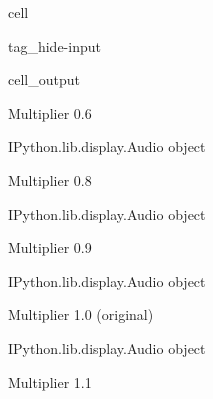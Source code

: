 \documentclass[letterpaper,10pt,english]{jupyterBook}
\begin{document}
\begin{sphinxuseclass}{cell}
\begin{sphinxuseclass}{tag_hide-input}\begin{sphinxVerbatimOutput}

\begin{sphinxuseclass}{cell_output}
\begin{sphinxVerbatim}[commandchars=\\\{\}]
Multiplier 0.6
\end{sphinxVerbatim}

\begin{sphinxVerbatim}[commandchars=\\\{\}]
\PYGZlt{}IPython.lib.display.Audio object\PYGZgt{}
\end{sphinxVerbatim}

\begin{sphinxVerbatim}[commandchars=\\\{\}]
Multiplier 0.8
\end{sphinxVerbatim}

\begin{sphinxVerbatim}[commandchars=\\\{\}]
\PYGZlt{}IPython.lib.display.Audio object\PYGZgt{}
\end{sphinxVerbatim}

\begin{sphinxVerbatim}[commandchars=\\\{\}]
Multiplier 0.9
\end{sphinxVerbatim}

\begin{sphinxVerbatim}[commandchars=\\\{\}]
\PYGZlt{}IPython.lib.display.Audio object\PYGZgt{}
\end{sphinxVerbatim}

\begin{sphinxVerbatim}[commandchars=\\\{\}]
Multiplier 1.0 (original)
\end{sphinxVerbatim}

\begin{sphinxVerbatim}[commandchars=\\\{\}]
\PYGZlt{}IPython.lib.display.Audio object\PYGZgt{}
\end{sphinxVerbatim}

\begin{sphinxVerbatim}[commandchars=\\\{\}]
Multiplier 1.1
\end{sphinxVerbatim}


\end{sphinxuseclass}
\end{sphinxVerbatimOutput}
\end{sphinxuseclass}
\end{sphinxuseclass}
\end{document}
